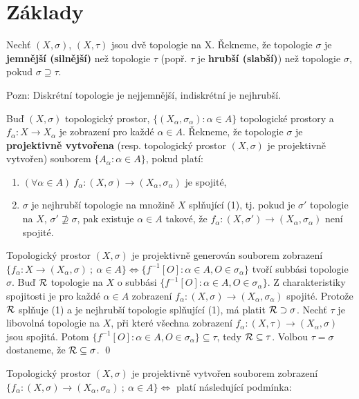 \documentclass[12pt,a4paper]{article}
\begin{document}
\section{Základy}
 Nechť $(X,\sigma)$, $(X,\tau)$ jsou dvě topologie na X. Řekneme, že topologie $\sigma$ je {\bf jemnější (silnější)} než topologie $\tau$ (popř. $\tau$ je {\bf hrubší (slabší)}) než topologie $\sigma$, pokud $\sigma \supseteq \tau$.

Pozn: Diskrétní topologie je nejjemnější, indiskrétní je nejhrubší.

 Buď $(X,\sigma)$ topologický prostor, $\{(X_\alpha,\sigma_\alpha) : \alpha \in A\}$ topologické prostory a $f_\alpha : X \to X_\alpha$ je zobrazení pro každé $\alpha \in A$. Řekneme, že topologie $\sigma$ je {\bf projektivně vytvořena} (resp. topologický prostor $(X,\sigma)$ je projektivně vytvořen) souborem $\{A_\alpha : \alpha \in A\}$, pokud platí:
\begin{enumerate}
\item $(\forall \alpha \in A)~f_\alpha : (X,\sigma) \to (X_\alpha,
	\sigma_\alpha)$ je spojité,
\item $\sigma$ je nejhrubší topologie na množině $X$ splňující (1), tj. pokud
	je $\sigma'$ topologie na $X$, $\sigma' \not\supseteq \sigma$, pak existuje
	$\alpha \in A$ takové, že $f_\alpha : (X,\sigma') \to (X_\alpha,
	\sigma_\alpha)$ není spojité.
\end{enumerate}

\tvrzeni Topologický prostor $(X,\sigma)$ je projektivně generován souborem
	zobrazení $\{f_\alpha : X \to (X_\alpha,\sigma)~;~\alpha \in A\} \iff \{
	f^{-1}[O] : \alpha \in A, O \in \sigma_\alpha\}$ tvoří subbási topologie
	$\sigma$.
\dukaz Buď $\mathcal{ R }$ topologie na $X$ o subbási $\{f^{-1}[O] : \alpha \in A, O \in \sigma_\alpha\}$. Z charakteristiky spojitosti je pro každé $\alpha \in A$ zobrazení $f_\alpha : (X,\sigma) \to (X_\alpha,\sigma_\alpha)$ spojité. Protože $\mathcal{ R }$ splňuje (1) a je nejhrubší topologie splňující (1), má platit $\mathcal{ R } \supset \sigma$. Nechť $\tau$ je libovolná topologie na $X$, při které všechna zobrazení $f_\alpha : (X,\tau) \to (X_\alpha,\sigma)$ jsou spojitá. Potom $\{f^{-1}[O] : \alpha \in A, O \in \sigma_\alpha\} \subseteq \tau$, tedy $\mathcal{ R } \subseteq \tau$. Volbou $\tau = \sigma$ dostaneme, že $\mathcal{ R } \subseteq \sigma$.
\qed

\veta Topologický prostor $(X, \sigma)$ je projektivně vytvořen souborem zobrazení $\{f_\alpha : (X,\sigma) \to (X_\alpha, \sigma_\alpha)~;~\alpha \in A\} \iff$ platí následující podmínka:
\end{document}
